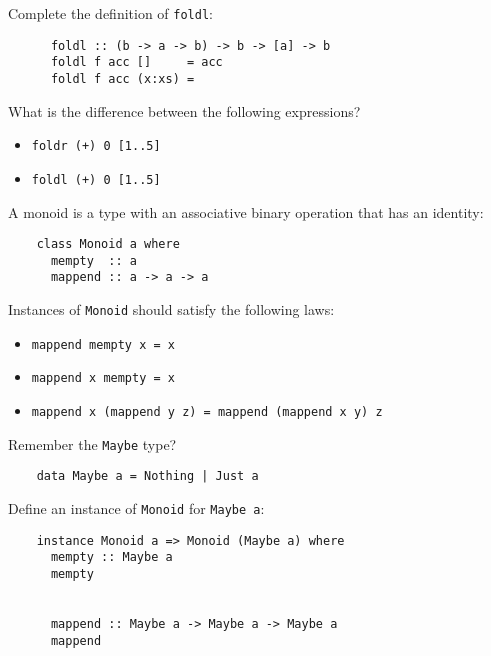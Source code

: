 \documentclass[a4paper,10pt,addpoints]{exam}
\begin{document}
\begin{questions}
\begin{parts}
    Complete the definition of \texttt{foldl}:

    \vspace{0.15in}

    \begin{verbatim}
      foldl :: (b -> a -> b) -> b -> [a] -> b
      foldl f acc []     = acc
      foldl f acc (x:xs) =
    \end{verbatim}


    \bonuspart[1]

    What is the difference between the following expressions?

    \vspace{0.15in}

    \begin{itemize}
    \item
      \texttt{foldr (+) 0 [1..5]}
    \item
      \texttt{foldl (+) 0 [1..5]}
    \end{itemize}


  \end{parts}


  \newpage

  \question[1]

  A monoid is a type with an associative binary operation that has an
  identity:

  \begin{verbatim}
    class Monoid a where
      mempty  :: a
      mappend :: a -> a -> a
  \end{verbatim}

  Instances of \texttt{Monoid} should satisfy the following laws:

  \begin{itemize}
  \item
    \texttt{mappend mempty x = x}
  \item
    \texttt{mappend x mempty = x}
  \item
    \texttt{mappend x (mappend y z) = mappend (mappend x y) z}
  \end{itemize}

  Remember the \texttt{Maybe} type?

  \begin{verbatim}
    data Maybe a = Nothing | Just a
  \end{verbatim}

  Define an instance of \texttt{Monoid} for \texttt{Maybe a}:

  \begin{verbatim}
    instance Monoid a => Monoid (Maybe a) where
      mempty :: Maybe a
      mempty


      mappend :: Maybe a -> Maybe a -> Maybe a
      mappend
  \end{verbatim}


\end{questions}

\newpage
\end{document}

